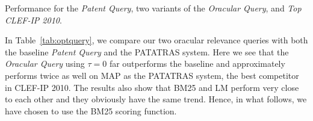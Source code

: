 %
%
%
%

\begin{table}[t!]
  \begin{center}
  \scriptsize
   \caption{Performance for the \textit{ Patent Query}, two variants of the \textit{ Oracular Query}, and \textit{ Top CLEF-IP 2010}.}
   \vspace*{1ex}
     
  \label{tab:optquery}
  \end{center}  
\end{table}

In Table~\ref{tab:optquery}, we compare our two oracular relevance
queries with both the baseline \textit{Patent Query} and the PATATRAS system.  Here we see that
the \emph{Oracular Query} using $\tau=0$ far outperforms the baseline and
approximately performs twice as well on MAP as the PATATRAS system, the best competitor in
CLEF-IP 2010. 
The results also show that BM25 and LM perform very close to each other and they obviously have the same trend. Hence, in what follows, we have chosen to use the BM25 scoring function.


